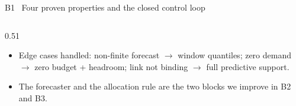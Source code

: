 \documentclass[aspectratio=169,10pt,xcolor={table,dvipsnames}]{beamer}
\begin{document}
\begin{frame}{B1 \textbullet\ Four proven properties and the closed control loop}
\begin{columns}[T]
\begin{column}{0.51\textwidth}
{}
\vspace{0.4em}
\begin{itemize}\footnotesize
  \item Edge cases handled: non-finite forecast $\to$ window quantiles; zero demand $\to$ zero budget + headroom; link not binding $\to$ full predictive support.
  \item The forecaster and the allocation rule are the two blocks we improve in B2 and B3.
\end{itemize}
\end{column}
\end{columns}
\end{frame}
\end{document}
